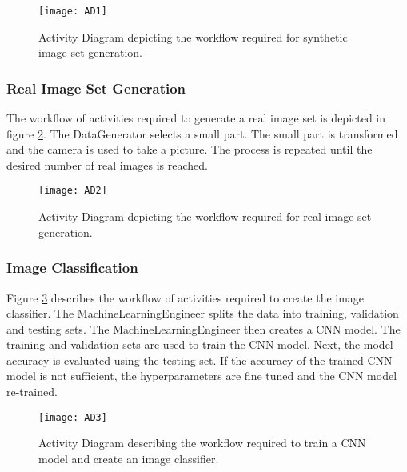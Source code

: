 \begin{figure}[H]
\centering
  \texttt{[image: AD1]}
\caption{Activity Diagram depicting the workflow required for synthetic image set generation.}
\label{fig:AD1}
\end{figure}

\subsubsection{Real Image Set Generation}
The workflow of activities required to generate a real image set is depicted in figure \ref{fig:AD2}. The DataGenerator selects a small part. The small part is transformed and the camera is used to take a picture. The process is repeated until the desired number of real images is reached.

\begin{figure}[H]
\centering
  \texttt{[image: AD2]}
\caption{Activity Diagram depicting the workflow required for real image set generation.}
\label{fig:AD2}
\end{figure}

\subsubsection{Image Classification}
Figure \ref{fig:AD3} describes the workflow of activities required to create the image classifier. The MachineLearningEngineer splits the data into training, validation and testing sets. The MachineLearningEngineer then creates a CNN model. The training and validation sets are used to train the CNN model. Next, the model accuracy is evaluated using the testing set. If the accuracy of the trained CNN model is not sufficient, the hyperparameters are fine tuned and the CNN model re-trained.

\begin{figure}[H]
\centering
  \texttt{[image: AD3]}
\caption{Activity Diagram describing the workflow required to train a CNN model and create an image classifier.}
\label{fig:AD3}
\end{figure}
